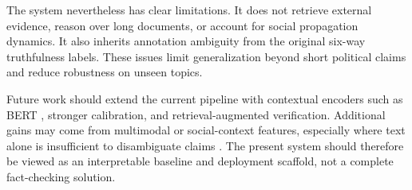 \documentclass[10pt,twocolumn,letterpaper]{article}
\begin{document}
The system nevertheless has clear limitations. It does not retrieve external evidence, reason over long documents, or account for social propagation dynamics. It also inherits annotation ambiguity from the original six-way truthfulness labels. These issues limit generalization beyond short political claims and reduce robustness on unseen topics.

Future work should extend the current pipeline with contextual encoders such as BERT \cite{devlin2019bert}, stronger calibration, and retrieval-augmented verification. Additional gains may come from multimodal or social-context features, especially where text alone is insufficient to disambiguate claims \cite{shu2017social,zhou2020survey}. The present system should therefore be viewed as an interpretable baseline and deployment scaffold, not a complete fact-checking solution.

{\small
{}

}
\end{document}
